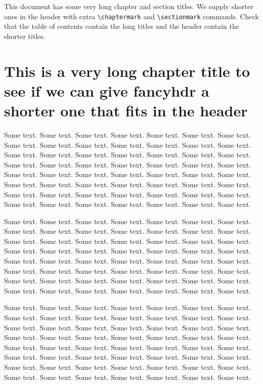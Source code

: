 \documentclass[oneside]{book}
\begin{document}
\thispagestyle{plain}
\tableofcontents

\bigskip

This document has some very long chapter and section titles. We supply shorter ones in the header with extra \verb|\chaptermark| and \verb|\sectionmark| commands.
Check that the table of contents contain the long titles and the header contain the shorter titles.

\chapter{This is a very long chapter title to see if we can give fancyhdr a shorter one that fits in the header}
\pagestyle{fancy}
\thispagestyle{fancy}

Some text. Some text. Some text. Some text. Some text. Some text. Some text. Some text. Some text. Some text. Some text. Some text. Some text. Some text. Some text. Some text. Some text. Some text. Some text. Some text. Some text. Some text. Some text. Some text. Some text. Some text. Some text. Some text. Some text. Some text. Some text. Some text. Some text. Some text. Some text. Some text. Some text. Some text. Some text. Some text. Some text. Some text. Some text. Some text. Some text. Some text. Some text. Some text. Some text. Some text. Some text. Some text. Some text. Some text. Some text. Some text. 

Some text. Some text. Some text. Some text. Some text. Some text. Some text. Some text. Some text. Some text. Some text. Some text. Some text. Some text. Some text. Some text. Some text. Some text. Some text. Some text. Some text. Some text. Some text. Some text. Some text. Some text. Some text. Some text. Some text. Some text. Some text. Some text. Some text. Some text. Some text. Some text. Some text. Some text. Some text. Some text. Some text. Some text. Some text. Some text. Some text. Some text. Some text. Some text. Some text. Some text. Some text. Some text. Some text. Some text. Some text. Some text. 

Some text. Some text. Some text. Some text. Some text. Some text. Some text. Some text. Some text. Some text. Some text. Some text. Some text. Some text. Some text. Some text. Some text. Some text. Some text. Some text. Some text. Some text. Some text. Some text. Some text. Some text. Some text. Some text. Some text. Some text. Some text. Some text. Some text. Some text. Some text. Some text. Some text. Some text. Some text. Some text. Some text. Some text. Some text. Some text. Some text. Some text. Some text. Some text. Some text. Some text. Some text. Some text. Some text. Some text. Some text. Some text. 
\end{document}
